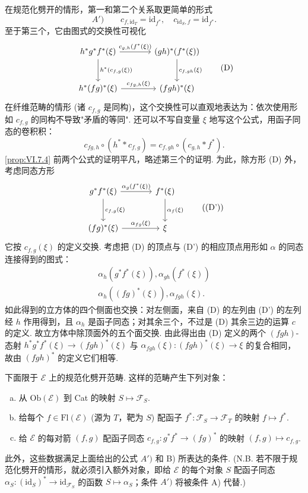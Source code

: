 在规范化劈开的情形，第一和第二个关系取更简单的形式
\[
A') \qquad c_{f,\mathrm{id}_T} = \mathrm{id}_{f^{*}}, \quad c_{\mathrm{id}_S,f} = \mathrm{id}_{f^{*}}.
\]
至于第三个，它由图式的交换性可视化
\begin{equation}
\begin{tikzcd}[row sep=large, column sep=large]
h^{*} g^{*} f^{*}(\xi) \arrow[r,"{c_{g,h}(f^{*}(\xi))}"] \arrow[d,"{h^{*}(c_{f,g}(\xi))}"] & (gh)^{*}(f^{*}(\xi)) \arrow[d,"{c_{f,gh}(\xi)}"] \\
h^{*}(fg)^{*}(\xi) \arrow[r,"{c_{fg,h}(\xi)}"] & (fgh)^{*}(\xi)
\end{tikzcd} \tag{D}
\label{eq:VI.D}
\end{equation}
在纤维范畴的情形 (诸 $c_{f,g}$ 是同构)，这个交换性可以直观地表达为：依次使用形如 $c_{f,g}$ 的同构不导致"矛盾的等同". 还可以不写自变量 $\xi$ 地写这个公式，用函子同态的卷积积：
\[
c_{fg,h} \circ (h^{*} * c_{f,g}) = c_{f,gh} \circ (c_{g,h} * f^{*}).
\]
\ref{prop:VI.7.4} 前两个公式的证明平凡，略述第三个的证明. 为此，除方形 (D) 外，考虑同态方形
\begin{equation}
\begin{tikzcd}[row sep=large, column sep=large]
g^{*} f^{*}(\xi) \arrow[r,"{\alpha_g(f^{*}(\xi))}"] \arrow[d,"{c_{f,g}(\xi)}"] & f^{*}(\xi) \arrow[d,"{\alpha_f(\xi)}"] \\
(fg)^{*}(\xi) \arrow[r,"{\alpha_{fg}(\xi)}"] & \xi
\end{tikzcd} \tag{(D')}
\end{equation}
它按 $c_{f,g}(\xi)$ 的定义交换. 考虑把 (D) 的顶点与 (D') 的相应顶点用形如 $\alpha$ 的同态连接得到的图式：
\[
\begin{array}{l}
\alpha_h(g^{*} f^{*}(\xi)), \alpha_{gh}(f^{*}(\xi)) \\
\alpha_h((fg)^{*}(\xi)), \alpha_{fgh}(\xi).
\end{array}
\]
如此得到的立方体的四个侧面也交换：对左侧面，来自 (D) 的左列由 (D') 的左列经 $h$ 作用得到，且 $\alpha_h$ 是函子同态；对其余三个，不过是 (D) 其余三边的运算 $c$ 的定义. 故立方体中除顶面外的五个面交换. 由此得出由 (D) 定义的两个 $(fgh)$-态射 $h^{*} g^{*} f^{*}(\xi) \to (fgh)^{*}(\xi)$ 与 $\alpha_{fgh}(\xi) \colon (fgh)^{*}(\xi) \to \xi$ 的复合相同，故由 $(fgh)^{*}$ 的定义它们相等.

下面限于 $\mathcal{E}$ 上的规范化劈开范畴. 这样的范畴产生下列对象：
\begin{enumerate}[a)]
\item 从 $\mathrm{Ob}(\mathcal{E})$ 到 Cat 的映射 $S \mapsto \mathcal{F}_S$.
\item 给每个 $f \in \mathrm{Fl}(\mathcal{E})$ (源为 $T$，靶为 $S$) 配函子 $f^{*} \colon \mathcal{F}_S \to \mathcal{F}_T$ 的映射 $f \mapsto f^{*}$.
\item 给 $\mathcal{E}$ 的每对箭 $(f, g)$ 配函子同态 $c_{f,g} \colon g^{*} f^{*} \to (fg)^{*}$ 的映射 $(f, g) \mapsto c_{f,g}$.
\end{enumerate}
此外，这些数据满足上面给出的公式 $A')$ 和 B) 所表达的条件. (N.B. 若不限于规范化劈开的情形，就必须引入额外对象，即给 $\mathcal{E}$ 的每个对象 $S$ 配函子同态 $\alpha_S \colon (\mathrm{id}_S)^{*} \to \mathrm{id}_{\mathcal{F}_S}$ 的函数 $S \mapsto \alpha_S$；条件 $A')$ 将被条件 A) 代替.)

